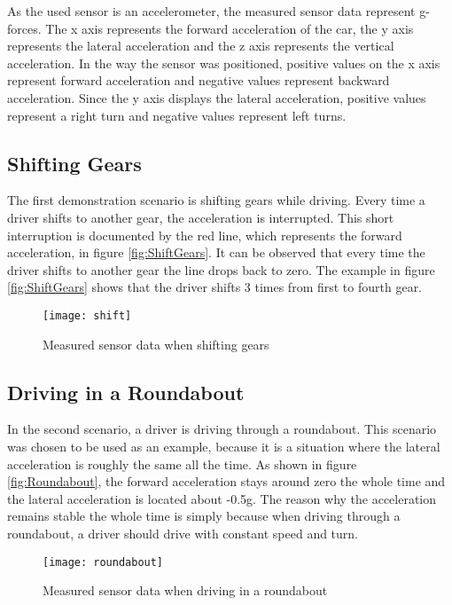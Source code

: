 As the used sensor is an accelerometer, the measured sensor data represent g-forces. The x axis represents the forward acceleration of the car, the y axis represents the lateral acceleration and the z axis represents the vertical acceleration. In the way the sensor was positioned, positive values on the x axis represent forward acceleration and negative values represent backward acceleration. Since the y axis displays the lateral acceleration, positive values represent a right turn and negative values represent left turns.

\subsection{Shifting Gears}
The first demonstration scenario is shifting gears while driving. Every time a driver shifts to another gear, the acceleration is interrupted. This short interruption is documented by the red line, which represents the forward acceleration, in figure \vref{fig:ShiftGears}. It can be observed that every time the driver shifts to another gear the line drops back to zero. The example in figure \vref{fig:ShiftGears} shows that the driver shifts 3 times from  first to fourth gear.

\begin{figure}[H]
    \centering
    \texttt{[image: shift]}
    \caption{Measured sensor data when shifting gears}
    \label{fig:ShiftGears}
\end{figure}

\subsection{Driving in a Roundabout}
In the second scenario, a driver is driving through a roundabout. This scenario was chosen to be used as an example, because it is a situation where the lateral acceleration is roughly the same all the time. As shown in figure \vref{fig:Roundabout}, the forward acceleration stays around zero the whole time and the lateral acceleration is located about -0.5g. The reason why the acceleration remains stable the whole time is simply because when driving through a roundabout, a driver should drive with constant speed and turn.

\begin{figure}[H]
    \centering
    \texttt{[image: roundabout]}
    \caption{Measured sensor data when driving in a roundabout}
    \label{fig:Roundabout}
\end{figure}

